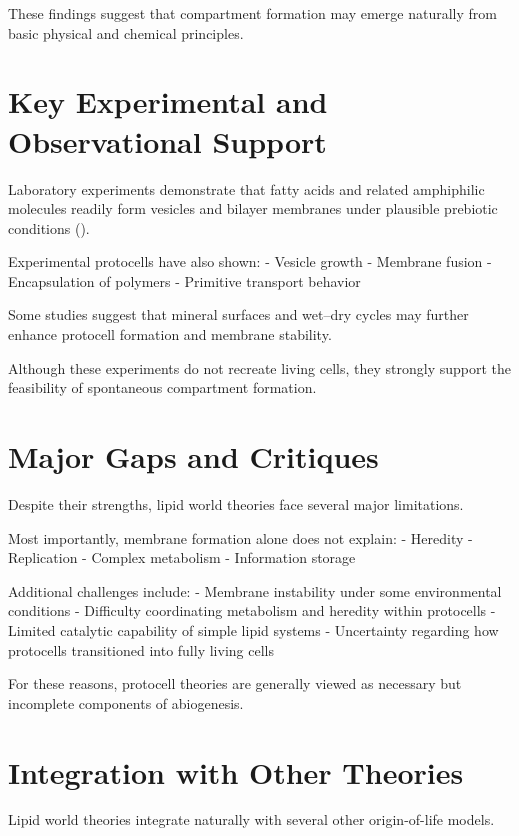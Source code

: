 \documentclass[
  oneside]{book}
\begin{document}
These findings suggest that compartment formation may emerge naturally from basic physical and chemical principles.

\section{Key Experimental and Observational Support}\label{key-experimental-and-observational-support-3}

Laboratory experiments demonstrate that fatty acids and related amphiphilic molecules readily form vesicles and bilayer membranes under plausible prebiotic conditions ().

Experimental protocells have also shown:
- Vesicle growth
- Membrane fusion
- Encapsulation of polymers
- Primitive transport behavior

Some studies suggest that mineral surfaces and wet--dry cycles may further enhance protocell formation and membrane stability.

Although these experiments do not recreate living cells, they strongly support the feasibility of spontaneous compartment formation.

\section{Major Gaps and Critiques}\label{major-gaps-and-critiques-3}

Despite their strengths, lipid world theories face several major limitations.

Most importantly, membrane formation alone does not explain:
- Heredity
- Replication
- Complex metabolism
- Information storage

Additional challenges include:
- Membrane instability under some environmental conditions
- Difficulty coordinating metabolism and heredity within protocells
- Limited catalytic capability of simple lipid systems
- Uncertainty regarding how protocells transitioned into fully living cells

For these reasons, protocell theories are generally viewed as necessary but incomplete components of abiogenesis.

\section{Integration with Other Theories}\label{integration-with-other-theories-3}

Lipid world theories integrate naturally with several other origin-of-life models.
\end{document}
